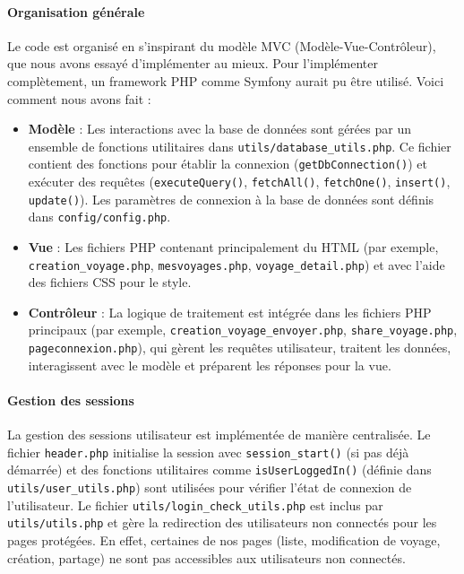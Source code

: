 \documentclass[a4paper,12pt]{article}
\begin{document}
\paragraph{Organisation générale}
Le code est organisé en s'inspirant du modèle MVC (Modèle-Vue-Contrôleur), que nous avons essayé d'implémenter au mieux. Pour l'implémenter complètement, un framework PHP comme Symfony aurait pu être utilisé. Voici comment nous avons fait :
\begin{itemize}
    \item \textbf{Modèle} : Les interactions avec la base de données sont gérées par un ensemble de fonctions utilitaires dans \texttt{utils/database\_utils.php}. Ce fichier contient des fonctions pour établir la connexion (\texttt{getDbConnection()}) et exécuter des requêtes (\texttt{executeQuery()}, \texttt{fetchAll()}, \texttt{fetchOne()}, \texttt{insert()}, \texttt{update()}). Les paramètres de connexion à la base de données sont définis dans \texttt{config/config.php}.
    \item \textbf{Vue} : Les fichiers PHP contenant principalement du HTML (par exemple, \texttt{creation\_voyage.php}, \texttt{mesvoyages.php}, \texttt{voyage\_detail.php}) et avec l'aide des fichiers CSS pour le style.
    \item \textbf{Contrôleur} : La logique de traitement est intégrée dans les fichiers PHP principaux (par exemple, \texttt{creation\_voyage\_envoyer.php}, \texttt{share\_voyage.php}, \texttt{pageconnexion.php}), qui gèrent les requêtes utilisateur, traitent les données, interagissent avec le modèle et préparent les réponses pour la vue.
\end{itemize}

\paragraph{Gestion des sessions}
La gestion des sessions utilisateur est implémentée de manière centralisée. Le fichier \texttt{header.php} initialise la session avec \texttt{session\_start()} (si pas déjà démarrée) et des fonctions utilitaires comme \texttt{isUserLoggedIn()} (définie dans \texttt{utils/user\_utils.php}) sont utilisées pour vérifier l'état de connexion de l'utilisateur. Le fichier \texttt{utils/login\_check\_utils.php} est inclus par \texttt{utils/utils.php} et gère la redirection des utilisateurs non connectés pour les pages protégées. En effet, certaines de nos pages (liste, modification de voyage, création, partage) ne sont pas accessibles aux utilisateurs non connectés.
\end{document}

